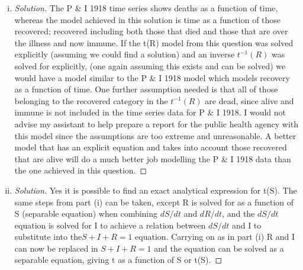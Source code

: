\documentclass[12pt]{article}
\begin{document}
\begin{enumerate}[(a)]
\begin{enumerate}[(i)]
{\begin{proof}[Solution]
	Since $I=0$ is trivial, take $\mathcal{R}_0=1/S$ and plug this into the expression for t(R) from 2(b)(i) giving 
	
	\begin{equation}
	t=\int \frac{1}{1-R-S_0e^{-R/S}}dR
	\end{equation}

	This expression may be useful because the expression relates time to peak prevalence. This means that if one can solve this expression, they will know at what amount of time units peak prevalence will occur.

\end{proof}
}

  \item \basicSIRanalQbiii
  
{\color{blue}
\begin{proof}[Solution]

	The P \& I 1918 time series shows deaths as a function of time, whereas the model achieved in this solution is time as a function of those recovered; recovered including both those that died and those that are over the illness and now immune. If the t(R) model from this question was solved explicitly (assuming we could find a solution) and an inverse $t^{-1}(R)$ was solved for explicitly, (one again assuming this exists and can be solved) we would have a model similar to the P \& I 1918 model which models recovery as a function of time. One further assumption needed is that all of those belonging to the recovered category in the $t^{-1}(R)$ are dead, since alive and immune is not included in the time series data for P \& I 1918. I would not advise my assistant to help prepare a report for the public health agency with this model since the assumptions are too extreme and unreasonable. A better model that has an explicit equation and takes into account those recovered that are alive will do a much better job modelling the P \& I 1918 data than the one achieved in this question.

\end{proof}
}
  
  
  \item \basicSIRanalQbiv
{\color{blue}
\begin{proof}[Solution]
	
	Yes it is possible to find an exact analytical expression for t(S). The same steps from part (i) can be taken, except R is solved for as a function of S (separable equation) when combining $dS/dt$ and $dR/dt$, and the $dS/dt$ equation is solved for I to achieve a relation between $dS/dt$ and I to substitute into the$ S+I+R=1$ equation. Carrying on as in part (i) R and I can now be replaced in $S+I+R=1$ and the equation can be solved as a separable equation, giving t as a function of S or t(S).


\end{proof}}
\end{enumerate}
\end{enumerate}
\end{document}
